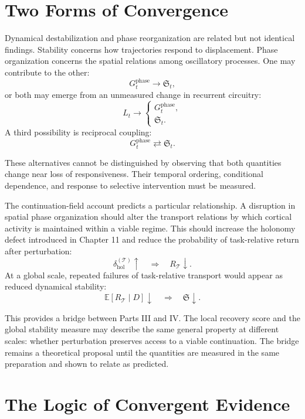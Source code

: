 \documentclass[11pt]{book}
\begin{document}
\section*{Two Forms of Convergence}

Dynamical destabilization and phase reorganization are related but not identical findings. Stability concerns how trajectories respond to displacement. Phase organization concerns the spatial relations among oscillatory processes. One may contribute to the other:
\[
G_t^{\mathrm{phase}}
\longrightarrow
\mathfrak S_t,
\]
or both may emerge from an unmeasured change in recurrent circuitry:
\[
L_t
\longrightarrow
\begin{cases}
G_t^{\mathrm{phase}},\\
\mathfrak S_t.
\end{cases}
\]
A third possibility is reciprocal coupling:
\[
G_t^{\mathrm{phase}}
\rightleftarrows
\mathfrak S_t.
\]

These alternatives cannot be distinguished by observing that both quantities change near loss of responsiveness. Their temporal ordering, conditional dependence, and response to selective intervention must be measured.

The continuation-field account predicts a particular relationship. A disruption in spatial phase organization should alter the transport relations by which cortical activity is maintained within a viable regime. This should increase the holonomy defect introduced in Chapter 11 and reduce the probability of task-relative return after perturbation:
\[
\delta_{\mathrm{hol}}^{(\mathcal T)}
\uparrow
\quad\Longrightarrow\quad
R_{\mathcal T}
\downarrow.
\]
At a global scale, repeated failures of task-relative transport would appear as reduced dynamical stability:
\[
\mathbb E[R_{\mathcal T}\mid D]
\downarrow
\quad\Longrightarrow\quad
\mathfrak S
\downarrow.
\]

This provides a bridge between Parts III and IV. The local recovery score and the global stability measure may describe the same general property at different scales: whether perturbation preserves access to a viable continuation. The bridge remains a theoretical proposal until the quantities are measured in the same preparation and shown to relate as predicted.

\section*{The Logic of Convergent Evidence}
\end{document}

